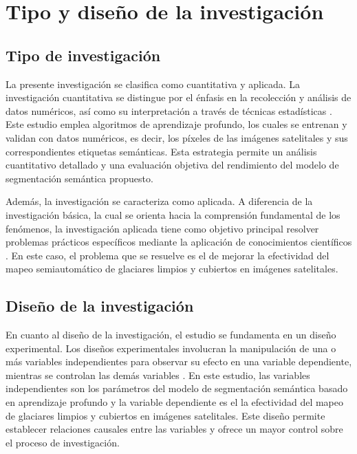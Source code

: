 \section{Tipo y diseño de la investigación}
\label{sec:TipoDisenoInvestigacion}

\subsection{Tipo de investigación}

La presente investigación se clasifica como cuantitativa y aplicada. La investigación cuantitativa se distingue por el énfasis en la recolección y análisis de datos numéricos, así como su interpretación a través de técnicas estadísticas \cite{kothari2004research, creswell2017research}. Este estudio emplea algoritmos de aprendizaje profundo, los cuales se entrenan y validan con datos numéricos, es decir, los píxeles de las imágenes satelitales y sus correspondientes etiquetas semánticas. Esta estrategia permite un análisis cuantitativo detallado y una evaluación objetiva del rendimiento del modelo de segmentación semántica propuesto.

Además, la investigación se caracteriza como aplicada. A diferencia de la investigación básica, la cual se orienta hacia la comprensión fundamental de los fenómenos, la investigación aplicada tiene como objetivo principal resolver problemas prácticos específicos mediante la aplicación de conocimientos científicos \cite{kothari2004research}. En este caso, el problema que se resuelve es el de mejorar la efectividad del mapeo semiautomático de glaciares limpios y cubiertos en imágenes satelitales.

\subsection{Diseño de la investigación}

En cuanto al diseño de la investigación, el estudio se fundamenta en un diseño experimental. Los diseños experimentales involucran la manipulación de una o más variables independientes para observar su efecto en una variable dependiente, mientras se controlan las demás variables \cite{marczyk2010essentials}. En este estudio, las variables independientes son los parámetros del modelo de segmentación semántica basado en aprendizaje profundo y la variable dependiente es el la efectividad del mapeo de glaciares limpios y cubiertos en imágenes satelitales. Este diseño permite establecer relaciones causales entre las variables y ofrece un mayor control sobre el proceso de investigación.